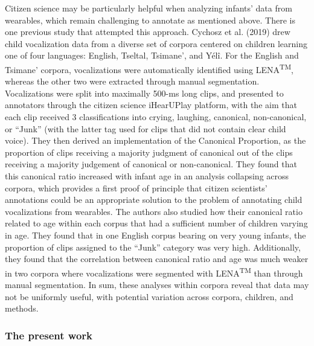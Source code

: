 \documentclass[english,,man,floatsintext]{apa6}
\begin{document}
Citizen science may be particularly helpful when analyzing infants' data from wearables, which remain challenging to annotate as mentioned above. There is one previous study that attempted this approach. Cychosz et al. (2019) drew child vocalization data from a diverse set of corpora centered on children learning one of four languages: English, Tseltal, Tsimane', and Yélî. For the English and Tsimane' corpora, vocalizations were automatically identified using LENA\textsuperscript{TM}, whereas the other two were extracted through manual segmentation. Vocalizations were split into maximally 500-ms long clips, and presented to annotators through the citizen science iHearUPlay platform, with the aim that each clip received 3 classifications into crying, laughing, canonical, non-canonical, or \enquote{Junk} (with the latter tag used for clips that did not contain clear child voice). They then derived an implementation of the Canonical Proportion, as the proportion of clips receiving a majority judgment of canonical out of the clips receiving a majority judgement of canonical or non-canonical. They found that this canonical ratio increased with infant age in an analysis collapsing across corpora, which provides a first proof of principle that citizen scientists' annotations could be an appropriate solution to the problem of annotating child vocalizations from wearables. The authors also studied how their canonical ratio related to age within each corpus that had a sufficient number of children varying in age. They found that in one English corpus bearing on very young infants, the proportion of clips assigned to the \enquote{Junk} category was very high. Additionally, they found that the correlation between canonical ratio and age was much weaker in two corpora where vocalizations were segmented with LENA\textsuperscript{TM} than through manual segmentation. In sum, these analyses within corpora reveal that data may not be uniformly useful, with potential variation across corpora, children, and methods.

\hypertarget{the-present-work}{%
\subsubsection{The present work}\label{the-present-work}}
\end{document}
